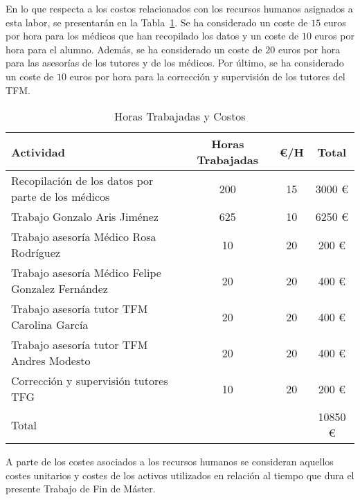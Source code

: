 En lo que respecta a los costos relacionados con los recursos humanos asignados a esta labor, se presentarán en la Tabla~\ref{tab:costes-rrhh}. Se ha considerado un coste de $15$ euros por hora para los médicos que han recopilado los datos y un coste de $10$ euros por hora para el alumno. Además, se ha considerado un coste de $20$ euros por hora para las asesorías de los tutores y de los médicos. Por último, se ha considerado un coste de $10$ euros por hora para la corrección y supervisión de los tutores del TFM.

\begin{table}[H]
    \centering
    \begin{tabular}{p{5cm}ccc}
    \toprule
    Actividad & Horas Trabajadas & €/H & Total \\
    \midrule
    Recopilación de los datos por parte de los médicos & 200 & 15 & 3000 € \\
    Trabajo Gonzalo Aris Jiménez & 625 & 10 & 6250 € \\
    Trabajo asesoría Médico Rosa Rodríguez & 10 & 20 & 200 €  \\
    Trabajo asesoría Médico Felipe Gonzalez Fernández & 20 & 20 & 400 € \\
    Trabajo asesoría tutor TFM Carolina García & 20 & 20 &  400 € \\
    Trabajo asesoría tutor TFM Andres Modesto & 20 & 20 &  400 € \\
    Corrección y supervisión tutores TFG & 10 & 20 & 200 € \\
    \midrule
    Total & & & 10850 € \\
    \bottomrule
    \end{tabular}
    \caption{Horas Trabajadas y Costos}\label{tab:costes-rrhh}
 \end{table}


 A parte de los costes asociados a los recursos humanos se consideran aquellos costes unitarios y costes de los activos utilizados en relación al tiempo que dura el presente Trabajo de Fin de Máster.

